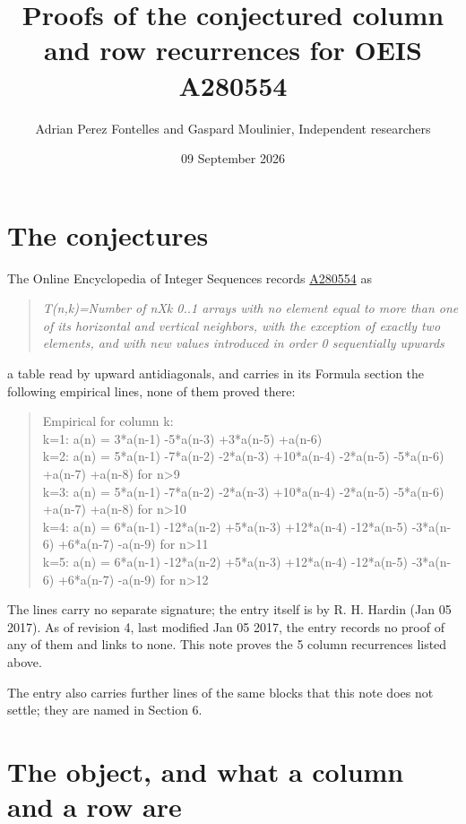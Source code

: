 \documentclass[11pt]{article}
\title{Proofs of the conjectured column and row recurrences for OEIS A280554}
\author{Adrian Perez Fontelles and Gaspard Moulinier, Independent researchers}
\date{09 September 2026}
\theoremstyle{definition}
\begin{document}
\maketitle
\section{The conjectures}

The Online Encyclopedia of Integer Sequences records \href{https://oeis.org/A280554}{A280554} as

\begin{quote}\itshape T(n,k)=Number of nXk 0..1 arrays with no element equal to more than one of its horizontal and vertical neighbors, with the exception of exactly two elements, and with new values introduced in order 0 sequentially upwards\end{quote}

a table read by upward antidiagonals, and carries in its Formula section the following empirical lines, none of them proved there:

\begin{quote}\ttfamily Empirical for column k:\\
k=1: a(n) = 3*a(n-1) -5*a(n-3) +3*a(n-5) +a(n-6)\\k=2: a(n) = 5*a(n-1) -7*a(n-2) -2*a(n-3) +10*a(n-4) -2*a(n-5) -5*a(n-6) +a(n-7) +a(n-8) for n>9\\k=3: a(n) = 5*a(n-1) -7*a(n-2) -2*a(n-3) +10*a(n-4) -2*a(n-5) -5*a(n-6) +a(n-7) +a(n-8) for n>10\\k=4: a(n) = 6*a(n-1) -12*a(n-2) +5*a(n-3) +12*a(n-4) -12*a(n-5) -3*a(n-6) +6*a(n-7) -a(n-9) for n>11\\k=5: a(n) = 6*a(n-1) -12*a(n-2) +5*a(n-3) +12*a(n-4) -12*a(n-5) -3*a(n-6) +6*a(n-7) -a(n-9) for n>12\end{quote}

The lines carry no separate signature; the entry itself is by R. H. Hardin (Jan 05 2017). As of revision 4, last modified Jan 05 2017, the entry records no proof of any of them and links to none. This note proves the 5 column recurrences listed above.

The entry also carries further lines of the same blocks that this note does not settle; they are named in Section 6.

\section{The object, and what a column and a row are}
\end{document}
